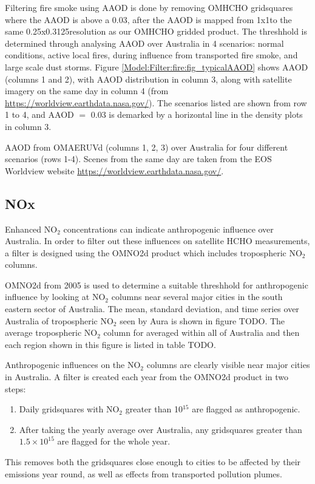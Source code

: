     Filtering fire smoke using AAOD is done by removing OMHCHO gridsquares where the AAOD is above a 0.03, after the AAOD is mapped from 1x1\degr to the same 0.25x0.3125\degr resolution as our OMHCHO gridded product.
    The threshhold is determined through analysing AAOD over Australia in 4 scenarios: normal conditions, active local fires, during influence from transported fire smoke, and large scale dust storms.
    Figure \ref{Model:Filter:fire:fig_typicalAAOD} shows AAOD (columns 1 and 2), with AAOD distribution in column 3, along with satellite imagery on the same day in column 4 (from \url{https://worldview.earthdata.nasa.gov/}).
    The scenarios listed are shown from row 1 to 4, and AAOD $=$ 0.03 is demarked by a horizontal line in the density plots in column 3.
    
      {AAOD from OMAERUVd (columns 1, 2, 3) over Australia for four different scenarios (rows 1-4). Scenes from the same day are taken from the EOS Worldview website \url{https://worldview.earthdata.nasa.gov/}.}
      {\label{Model:Filter:fire:fig_typicalAAOD}}
  
  
  \subsection{NOx}
    \label{Model:Filter:NOx}
    
    Enhanced NO$_2$ concentrations can indicate anthropogenic influence over Australia.
    In order to filter out these influences on satellite HCHO measurements, a filter is designed using the OMNO2d product which includes tropospheric NO$_2$ columns.
    
    OMNO2d from 2005 is used to determine a suitable threshhold for anthropogenic influence by looking at NO$_2$ columns near several major cities in the south eastern sector of Australia.
    The mean, standard deviation, and time series over Australia of tropospheric NO$_2$ seen by Aura is shown in figure TODO.
    The average tropospheric NO$_2$ column for averaged within all of Australia and then each region shown in this figure is listed in table TODO.
    
    Anthropogenic influences on the NO$_2$ columns are clearly visible near major cities in Australia.
    A filter is created each year from the OMNO2d product in two steps:
    \begin{enumerate}
      \item Daily gridsquares with NO$_2$ greater than 10$^{15}$  are flagged as anthropogenic.
      \item After taking the yearly average over Australia, any gridsquares greater than $1.5 \times 10^{15}$ are flagged for the whole year.
    \end{enumerate}
    This removes both the gridsquares close enough to cities to be affected by their emissions year round, as well as effects from transported pollution plumes.
    
